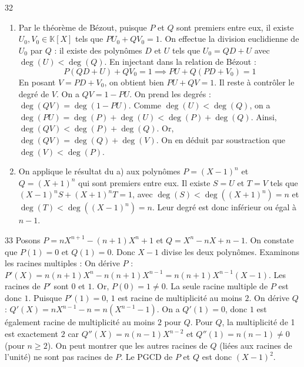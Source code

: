 \begin{correction}{32}
\begin{enumerate}
 \item[a)] Par le théorème de Bézout, puisque $P$ et $Q$ sont premiers entre eux, il existe $U_0, V_0 \in \mathbb{K}[X]$ tels que $P U_0 + Q V_0 = 1$. 
 On effectue la division euclidienne de $U_0$ par $Q$ : il existe des polynômes $D$ et $U$ tels que $U_0 = Q D + U$ avec $\deg(U) < \deg(Q)$. 
 En injectant dans la relation de Bézout :
 $$ P(QD + U) + Q V_0 = 1 \implies PU + Q(PD + V_0) = 1 $$ 
 En posant $V = PD + V_0$, on obtient bien $PU + QV = 1$. 
 Il reste à contrôler le degré de $V$. On a $QV = 1 - PU$. 
 On prend les degrés : $\deg(QV) = \deg(1 - PU)$. Comme $\deg(U) < \deg(Q)$, on a $\deg(PU) = \deg(P) + \deg(U) < \deg(P) + \deg(Q)$. 
 Ainsi, $\deg(QV) < \deg(P) + \deg(Q)$. Or, $\deg(QV) = \deg(Q) + \deg(V)$. 
 On en déduit par soustraction que $\deg(V) < \deg(P)$. 
 
 \item[b)] On applique le résultat du a) aux polynômes $P = (X-1)^n$ et $Q = (X+1)^n$ qui sont premiers entre eux. 
 Il existe $S = U$ et $T = V$ tels que $(X-1)^n S + (X+1)^n T = 1$, avec $\deg(S) < \deg((X+1)^n) = n$ et $\deg(T) < \deg((X-1)^n) = n$. 
 Leur degré est donc inférieur ou égal à $n-1$. 
\end{enumerate}
\end{correction}

\begin{correction}{33}
Posons $P = nX^{n+1}-(n+1)X^{n}+1$ et $Q = X^{n}-nX+n-1$.
On constate que $P(1) = 0$ et $Q(1) = 0$. Donc $X-1$ divise les deux polynômes.
Examinons les racines multiples :
On dérive $P$ : $P'(X) = n(n+1)X^n - n(n+1)X^{n-1} = n(n+1)X^{n-1}(X-1)$.
Les racines de $P'$ sont $0$ et $1$. Or, $P(0) = 1 \neq 0$. La seule racine multiple de $P$ est donc $1$. Puisque $P'(1)=0$, $1$ est racine de multiplicité au moins $2$.
On dérive $Q$ : $Q'(X) = nX^{n-1} - n = n(X^{n-1} - 1)$.
On a $Q'(1) = 0$, donc $1$ est également racine de multiplicité au moins $2$ pour $Q$.
Pour $Q$, la multiplicité de 1 est exactement $2$ car $Q''(X) = n(n-1)X^{n-2}$ et $Q''(1) = n(n-1) \neq 0$ (pour $n \ge 2$).
On peut montrer que les autres racines de $Q$ (liées aux racines de l'unité) ne sont pas racines de $P$. 
Le PGCD de $P$ et $Q$ est donc $(X-1)^2$.
\end{correction}

